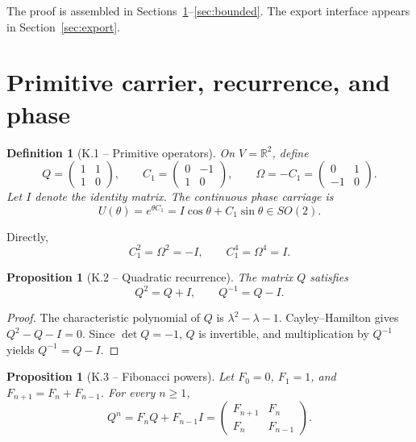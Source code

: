 \documentclass[11pt,letterpaper]{article}
\theoremstyle{kernelstyle}
\newtheorem{proposition}[theorem]{Proposition}
\newtheorem{definition}[theorem]{Definition}
\newcommand{\R}{\mathbb{R}}
\begin{document}
The proof is assembled in Sections~\ref{sec:primitive}--\ref{sec:bounded}.  The export interface appears in Section~\ref{sec:export}.

\section{Primitive carrier, recurrence, and phase}\label{sec:primitive}

\begin{definition}[K.1 -- Primitive operators]
On $V=\R^2$, define
\begin{equation}\label{eq:base}
Q=
\begin{pmatrix}
1&1\\
1&0
\end{pmatrix},
\qquad
C_1=
\begin{pmatrix}
0&-1\\
1&0
\end{pmatrix},
\qquad
\Omega=-C_1=
\begin{pmatrix}
0&1\\
-1&0
\end{pmatrix}.
\end{equation}
Let $I$ denote the identity matrix.  The continuous phase carriage is
\begin{equation}\label{eq:phase}
U(\theta)=e^{\theta C_1}=I\cos\theta+C_1\sin\theta\in SO(2).
\end{equation}
\end{definition}

Directly,
\begin{equation}\label{eq:quarter}
C_1^2=\Omega^2=-I,
\qquad
C_1^4=\Omega^4=I.
\end{equation}

\begin{proposition}[K.2 -- Quadratic recurrence]\label{prop:quadratic}
The matrix $Q$ satisfies
\begin{equation}\label{eq:qquad}
Q^2=Q+I,
\qquad
Q^{-1}=Q-I.
\end{equation}
\end{proposition}

\begin{proof}
The characteristic polynomial of $Q$ is $\lambda^2-\lambda-1$.  Cayley--Hamilton gives $Q^2-Q-I=0$.  Since $\det Q=-1$, $Q$ is invertible, and multiplication by $Q^{-1}$ yields $Q^{-1}=Q-I$.
\end{proof}

\begin{proposition}[K.3 -- Fibonacci powers]\label{prop:fibpowers}
Let $F_0=0$, $F_1=1$, and $F_{n+1}=F_n+F_{n-1}$.  For every $n\ge1$,
\begin{equation}\label{eq:fibpower}
Q^n=F_nQ+F_{n-1}I
=
\begin{pmatrix}
F_{n+1}&F_n\\
F_n&F_{n-1}
\end{pmatrix}.
\end{equation}
\end{proposition}
\end{document}
